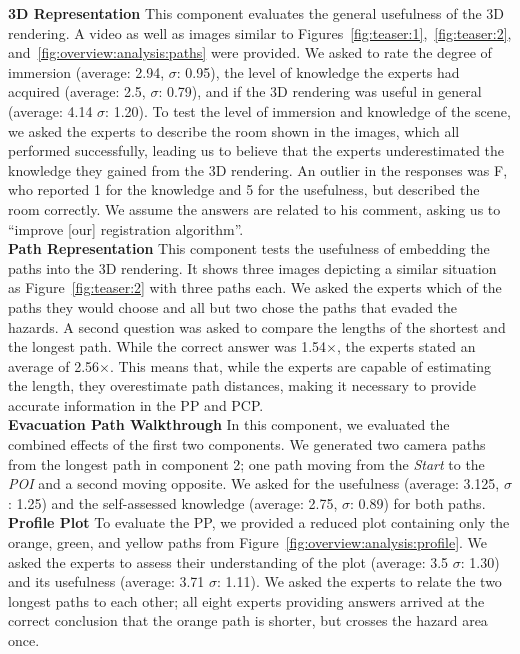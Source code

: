 \documentclass{egpubl}
\begin{document}
\noindent \textbf{3D Representation} This component evaluates the general usefulness of the 3D rendering. A video as well as images similar to Figures~\ref{fig:teaser:1},~\ref{fig:teaser:2}, and~\ref{fig:overview:analysis:paths} were provided. We asked to rate the degree of immersion (average: 2.94, $\sigma$: 0.95), the level of knowledge the experts had acquired (average: 2.5, $\sigma$: 0.79), and if the 3D rendering was useful in general (average: 4.14 $\sigma$: 1.20). To test the level of immersion and knowledge of the scene, we asked the experts to describe the room shown in the images, which all performed successfully, leading us to believe that the experts underestimated the knowledge they gained from the 3D rendering. An outlier in the responses was F, who reported 1 for the knowledge and 5 for the usefulness, but described the room correctly. We assume the answers are related to his comment, asking us to ``improve [our] registration algorithm''. \\
%
\textbf{Path Representation} This component tests the usefulness of embedding the paths into the 3D rendering. It shows three images depicting a similar situation as Figure~\ref{fig:teaser:2} with three paths each. We asked the experts which of the paths they would choose and all but two chose the paths that evaded the hazards. A second question was asked to compare the lengths of the shortest and the longest path. While the correct answer was 1.54$\times$, the experts stated an average of 2.56$\times$. This means that, while the experts are capable of estimating the length, they overestimate path distances, making it necessary to provide accurate information in the PP and PCP.\\
%
\noindent \textbf{Evacuation Path Walkthrough} In this component, we evaluated the combined effects of the first two components. We generated two camera paths from the longest path in component 2; one path moving from the \emph{Start} to the \emph{POI} and a second moving opposite. We asked for the usefulness (average: 3.125, $\sigma$: 1.25) and the self-assessed knowledge (average: 2.75, $\sigma$: 0.89) for both paths. \\
%
\textbf{Profile Plot} To evaluate the PP, we provided a reduced plot containing only the orange, green, and yellow paths from Figure~\ref{fig:overview:analysis:profile}. We asked the experts to assess their understanding of the plot (average: 3.5 $\sigma$: 1.30) and its usefulness (average: 3.71 $\sigma$: 1.11). We asked the experts to relate the two longest paths to each other; all eight experts providing answers arrived at the correct conclusion that the orange path is shorter, but crosses the hazard area once. \\
\end{document}
